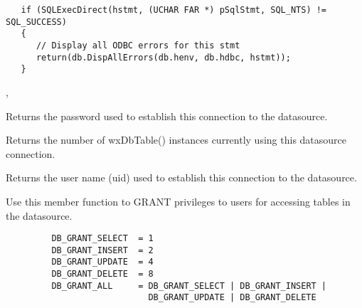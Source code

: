 
\begin{verbatim}
   if (SQLExecDirect(hstmt, (UCHAR FAR *) pSqlStmt, SQL_NTS) != SQL_SUCCESS)
   {
      // Display all ODBC errors for this stmt
      return(db.DispAllErrors(db.henv, db.hdbc, hstmt));
   }
\end{verbatim}


, 


\label{wxdbgetpassword}


Returns the password used to establish this connection to the datasource.


\label{wxdbgettablecount}


Returns the number of wxDbTable() instances currently using this datasource 
connection.


\label{wxdbgetusername}


Returns the user name (uid) used to establish this connection to the 
datasource.


\label{wxdbgrant}


Use this member function to GRANT privileges to users for accessing tables in 
the datasource.



\begin{verbatim}
         DB_GRANT_SELECT  = 1
         DB_GRANT_INSERT  = 2
         DB_GRANT_UPDATE  = 4
         DB_GRANT_DELETE  = 8
         DB_GRANT_ALL     = DB_GRANT_SELECT | DB_GRANT_INSERT |
                            DB_GRANT_UPDATE | DB_GRANT_DELETE
\end{verbatim}

